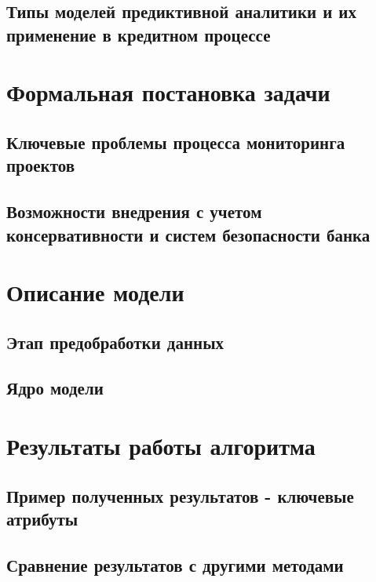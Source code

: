 \documentclass[12pt,a4paper]{article} %
\begin{document}
\subsection{Типы моделей предиктивной аналитики и их применение в кредитном процессе}


\newpage
\section{Формальная постановка задачи}

\subsection{Ключевые проблемы процесса мониторинга проектов}

\subsection{Возможности внедрения с учетом консервативности и систем безопасности банка}



\newpage
\section{Описание модели}
 
\subsection{Этап предобработки данных}
 
\subsection{Ядро модели}


\newpage
\section{Результаты работы алгоритма}
\subsection{Пример полученных результатов - ключевые атрибуты}

\subsection{Сравнение результатов с другими методами}
\end{document}

